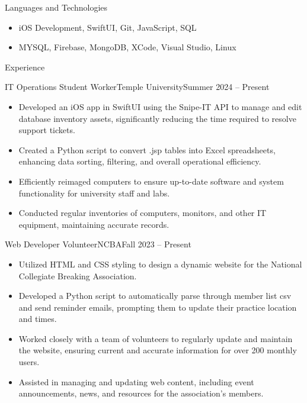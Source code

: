 \documentclass[]{mcdowellcv}
\begin{document}
	\makeheader
	
	

	\begin{cvsection}{Languages and Technologies}
		\begin{cvsubsection}{}{}{}	
			\begin{itemize}
				\item iOS Development, SwiftUI, Git, JavaScript, SQL
				\item MYSQL, Firebase, MongoDB, XCode, Visual Studio, Linux
			\end{itemize}
		\end{cvsubsection}
	\end{cvsection}

	\begin{cvsection}{Experience}
		\begin{cvsubsection}{IT Operations Student Worker}{Temple University}{Summer 2024 -- Present}			
			\begin{itemize}
				\item Developed an iOS app in SwiftUI using the Snipe-IT API to manage and edit database inventory assets, significantly reducing the time required to resolve support tickets.
				\item Created a Python script to convert .jsp tables into Excel spreadsheets, enhancing data sorting, filtering, and overall operational efficiency.
				\item Efficiently reimaged computers to ensure up-to-date software and system functionality for university staff and labs.
				\item Conducted regular inventories of computers, monitors, and other IT equipment, maintaining accurate records.
			\end{itemize}
		\end{cvsubsection}
		
		\begin{cvsubsection}{Web Developer Volunteer}{NCBA}{Fall 2023 -- Present}	
			\begin{itemize}
				\item Utilized HTML and CSS styling to design a dynamic website for the National Collegiate Breaking Association.
				\item Developed a Python script to automatically parse through member list csv and send reminder emails, prompting them to update their practice location and times.
				\item Worked closely with a team of volunteers to regularly update and maintain the website, ensuring current and accurate information for over 200 monthly users.
				\item Assisted in managing and updating web content, including event announcements, news, and resources for the association's members.
			\end{itemize}
		\end{cvsubsection}
	\end{cvsection}
\end{document}
